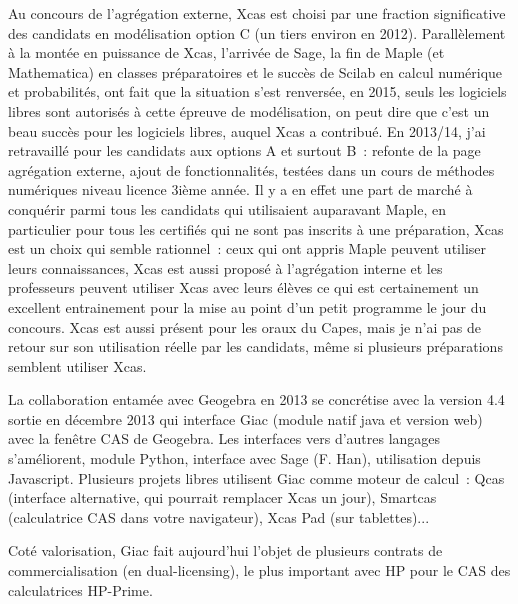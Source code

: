 \documentclass[a4paper,11pt]{book}
\begin{document}
\begin{giacjshere}
Au concours de l'agr\'egation externe,
Xcas est choisi par une fraction
significative des candidats en mod\'elisation option C
(un tiers environ en 2012).
Parall\`element \`a la mont\'ee en
puissance de Xcas, l'arriv\'ee de Sage, la fin de Maple (et
Mathematica) en classes pr\'eparatoires
et le succ\`es de Scilab en calcul num\'erique et probabilit\'es, ont
fait que la situation s'est renvers\'ee, en 2015,
seuls les logiciels libres sont autoris\'es
\`a cette \'epreuve de mod\'elisation, on peut
dire que c'est un beau succ\`es pour les logiciels libres,
auquel Xcas a contribu\'e.
En 2013/14, j'ai retravaill\'e pour les candidats
aux options A et surtout B~: refonte de
la page agr\'egation externe, ajout de fonctionnalit\'es,
test\'ees dans un cours de m\'ethodes num\'eriques
niveau licence 3i\`eme ann\'ee. Il y a en effet une part de march\'e
\`a conqu\'erir parmi tous les candidats qui utilisaient auparavant
Maple, en particulier pour tous les certifi\'es qui
ne sont pas inscrits \`a une pr\'eparation, Xcas est un choix
qui semble rationnel~: ceux qui ont appris Maple peuvent
utiliser leurs connaissances, Xcas est aussi propos\'e
\`a l'agr\'egation interne et les professeurs peuvent utiliser Xcas avec
leurs \'el\`eves ce qui est certainement un excellent entrainement
pour la mise au point d'un petit programme le jour du concours.
Xcas est aussi pr\'esent pour les oraux du Capes, mais je n'ai
pas de retour sur son utilisation r\'eelle par les candidats,
m\^eme si plusieurs pr\'eparations semblent utiliser Xcas.

La collaboration entam\'ee avec Geogebra en 2013
se concr\'etise avec la version 4.4 sortie en d\'ecembre 2013
qui interface Giac (module natif java et version
web) avec la fen\^etre CAS de Geogebra.
Les interfaces vers d'autres langages s'am\'eliorent,
module Python, interface avec Sage (F. Han),
utilisation depuis Javascript. Plusieurs projets
libres utilisent Giac comme moteur de calcul~: Qcas (interface
alternative, qui pourrait remplacer Xcas un jour),
Smartcas (calculatrice CAS dans votre navigateur),
Xcas Pad (sur tablettes)...

Cot\'e valorisation, Giac fait aujourd'hui l'objet de
plusieurs contrats de
commercialisation (en dual-licensing), le plus important avec HP
pour le CAS des calculatrices HP-Prime.


\end{giacjshere}
\end{document}
